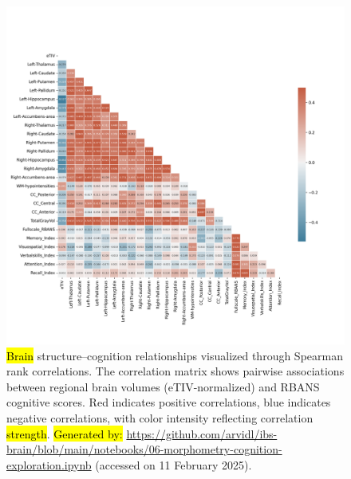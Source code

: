 \documentclass[diagnostics,article,accept,pdftex,moreauthors]{Definitions/mdpi}
\begin{document}
\begin{figure}[H]
 \includegraphics[width=1\textwidth]{figs/spearman_correlation_matrix_RBANS_ASEG.png} 

\caption{{{\hl{Brain} %
 structure--cognition relationships visualized through Spearman rank correlations}}. {The correlation} 
matrix shows pairwise associations between regional brain volumes (eTIV-normalized) and RBANS cognitive scores. Red indicates positive correlations, blue indicates negative correlations, with color intensity reflecting correlation \hl{strength}. %
{\hl{Generated by:} {{\url{https://github.com/arvidl/ibs-brain/blob/main/notebooks/06-morphometry-cognition-exploration.ipynb}}}} (accessed on 11 February 2025).}
\label{fig:spearman_correlation_matrix_RBANS_ASEG}
\end{figure} 
\end{document}
